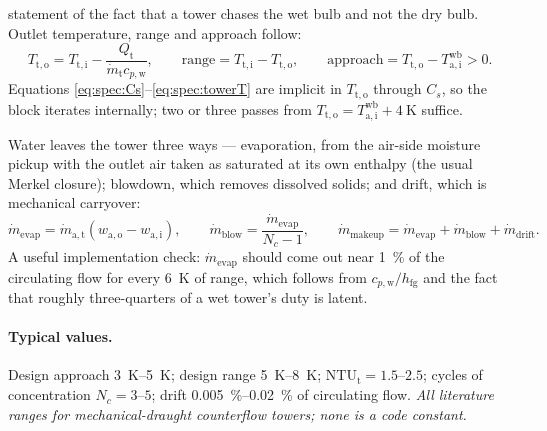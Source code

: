 \documentclass[11pt]{article}
\newcommand{\md}{\ensuremath{\dot m}}
\newcommand{\hfg}{\ensuremath{h_{\mathrm{fg}}}}
\begin{document}
statement of the fact that a tower chases the wet bulb and not the dry bulb. Outlet temperature,
range and approach follow:
\begin{equation}
T_{\mathrm{t,o}} = T_{\mathrm{t,i}} - \frac{Q_{\mathrm{t}}}{\md_{\mathrm{t}}c_{p,\mathrm{w}}} ,
\qquad
\mathrm{range} = T_{\mathrm{t,i}} - T_{\mathrm{t,o}} ,
\qquad
\mathrm{approach} = T_{\mathrm{t,o}} - T_{\mathrm{a,i}}^{\mathrm{wb}} > 0 .
\label{eq:spec:towerT}
\end{equation}
Equations \eqref{eq:spec:Cs}--\eqref{eq:spec:towerT} are implicit in $T_{\mathrm{t,o}}$ through
$C_{s}$, so the block iterates internally; two or three passes from
$T_{\mathrm{t,o}}=T_{\mathrm{a,i}}^{\mathrm{wb}}+\SI{4}{\kelvin}$ suffice.

Water leaves the tower three ways --- evaporation, from the air-side moisture pickup with the outlet
air taken as saturated at its own enthalpy (the usual Merkel closure); blowdown, which removes
dissolved solids; and drift, which is mechanical carryover:
\begin{equation}
\md_{\mathrm{evap}} = \md_{\mathrm{a,t}}\left(w_{\mathrm{a,o}}-w_{\mathrm{a,i}}\right) ,
\qquad
\md_{\mathrm{blow}} = \frac{\md_{\mathrm{evap}}}{N_{c}-1} ,
\qquad
\md_{\mathrm{makeup}} = \md_{\mathrm{evap}} + \md_{\mathrm{blow}} + \md_{\mathrm{drift}} .
\label{eq:spec:towerwater}
\end{equation}
A useful implementation check: $\md_{\mathrm{evap}}$ should come out near \SI{1}{\percent} of the
circulating flow for every \SI{6}{\kelvin} of range, which follows from $c_{p,\mathrm{w}}/\hfg$ and
the fact that roughly three-quarters of a wet tower's duty is latent.

\paragraph{Typical values.} Design approach \SIrange{3}{5}{\kelvin}; design range
\SIrange{5}{8}{\kelvin}; $\mathrm{NTU}_{\mathrm{t}}=\numrange{1.5}{2.5}$; cycles of concentration
$N_{c}=\numrange{3}{5}$; drift \SIrange{0.005}{0.02}{\percent} of circulating flow. \emph{All
literature ranges for mechanical-draught counterflow towers; none is a code constant.}
\end{document}
